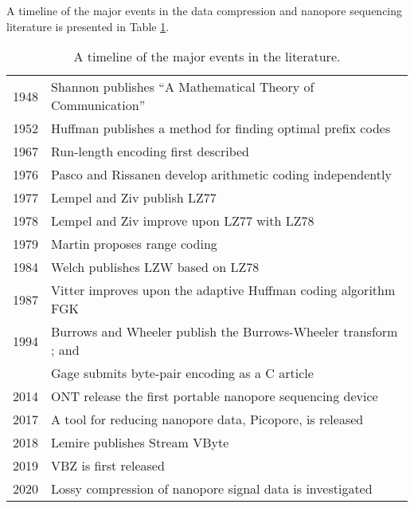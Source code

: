 A timeline of the major events in the data compression and nanopore sequencing literature is presented in Table \ref{tab:lit}.

\begin{table}
\centering
\caption{A timeline of the major events in the literature.}
\label{tab:lit}
\begin{tabular}{r l}
\hline
1948 & Shannon publishes ``A Mathematical Theory of Communication'' \cite{shannon}\\
1952 & Huffman publishes a method for finding optimal prefix codes \cite{huffman}\\
1967 & Run-length encoding first described \cite{rle}\\
1976 & Pasco and Rissanen develop arithmetic coding independently \cite{arithmetic-coding}\\
1977 & Lempel and Ziv publish LZ77 \cite{lz77}\\
1978 & Lempel and Ziv improve upon LZ77 with LZ78 \cite{lz78}\\
1979 & Martin proposes range coding \cite{range-coding}\\
1984 & Welch publishes LZW based on LZ78 \cite{lzw}\\
1987 & Vitter improves upon the adaptive Huffman coding algorithm FGK \cite{vitter}\\
1994 & Burrows and Wheeler publish the Burrows-Wheeler transform \cite{bwt}; and \\
& Gage submits byte-pair encoding as a C article \cite{byte-pair}\\
2014 & ONT release the first portable nanopore sequencing device\\
2017 & A tool for reducing nanopore data, Picopore, is released \cite{picopore}\\
2018 & Lemire publishes Stream VByte \cite{svb}\\
2019 & VBZ is first released \cite{vbz}\\
2020 & Lossy compression of nanopore signal data is investigated \cite{lossy-nano}\\
\hline
\end{tabular}
\end{table}
